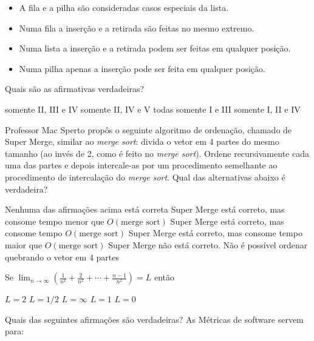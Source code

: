 \documentclass[12pt, addpoints]{exam}
\begin{document}
\begin{questions}
\begin{itemize}
    \item A fila e a pilha são consideradas casos especiais da lista.

    \item Numa fila a inserção e a retirada são feitas no mesmo extremo.

    \item Numa lista a inserção e a retirada podem ser feitas em qualquer posição.

    \item Numa pilha apenas a inserção pode ser feita em qualquer posição.

\end{itemize}



Quais são as afirmativas verdadeiras?
\begin{choices}
\choice somente II, III e IV
\choice somente II, IV e V
\choice todas
\choice somente I e III
\choice somente I, II e IV
\end{choices}

\question

Professor Mac Sperto propôs o seguinte algoritmo de ordenação, chamado de Super Merge, similar ao \textit{merge sort}: divida o vetor em 4 partes do mesmo tamanho (ao invés de 2, como é feito no \textit{merge sort}). Ordene recursivamente cada uma das partes e depois intercale-as por um procedimento semelhante ao procedimento de intercalação do \textit{merge sort}. Qual das alternativas abaixo é verdadeira?
\begin{choices}
\choice Nenhuma das afirmações acima está correta
\choice Super Merge está correto, mas consome tempo menor que \( O(\text{merge sort}) \)
\choice Super Merge está correto, mas consome tempo \( O(\text{merge sort}) \)
\choice Super Merge está correto, mas consome tempo maior que \( O(\text{merge sort}) \)
\choice Super Merge não está correto. Não é possível ordenar quebrando o vetor em 4 partes
\end{choices}

\question

Se \( \lim_{n \to \infty} \left( \frac{1}{n^2} + \frac{2}{n^2} + \cdots + \frac{n-1}{n^2} \right) = L \) então


\begin{choices}
\choice \( L = 2 \)
\choice \( L = 1/2 \)
\choice \( L = \infty \)
\choice \( L = 1 \)
\choice \( L = 0 \)
\end{choices}

\question

Quais das seguintes afirmações são verdadeiras? As Métricas de software servem para:




\end{questions}
\end{document}
